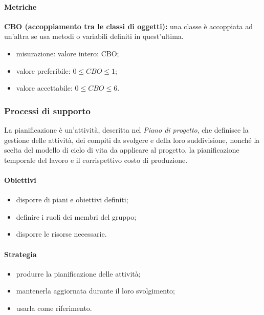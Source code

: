 \paragraph{Metriche}
\textbf{CBO (accoppiamento tra le classi di oggetti):} una classe è accoppiata ad un'altra se usa metodi o variabili definiti in quest'ultima.
\begin{itemize}
    \item misurazione: valore intero: CBO;
    \item valore preferibile: $0 \leq CBO \leq 1$;
    \item valore accettabile: $0 \leq CBO \leq 6$.
\end{itemize}
\subsubsection{Processi di supporto}
La pianificazione è un'attività, descritta nel \textit{Piano di progetto}, che definisce la gestione delle  attività, dei compiti da svolgere e della loro suddivisione, nonché la scelta
del modello di ciclo di vita da applicare al progetto, la pianificazione temporale del lavoro e il corrispettivo costo di produzione.
\paragraph{Obiettivi}
\begin{itemize}
    \item disporre di piani e obiettivi  definiti;
    \item definire i ruoli dei membri del gruppo;
    \item disporre le risorse necessarie.
\end{itemize}
\paragraph{Strategia}
\begin{itemize}
    \item produrre la pianificazione delle attività;
    \item mantenerla aggiornata durante il loro svolgimento;
    \item usarla come riferimento.
\end{itemize}
